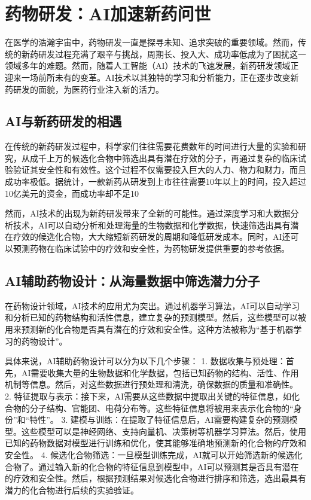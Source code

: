 \section{药物研发：AI加速新药问世}
在医学的浩瀚宇宙中，药物研发一直是探寻未知、追求突破的重要领域。然而，传统的新药研发过程充满了艰辛与挑战，周期长、投入大、成功率低成为了困扰这一领域多年的难题。然而，随着人工智能（AI）技术的飞速发展，新药研发领域正迎来一场前所未有的变革。AI技术以其独特的学习和分析能力，正在逐步改变新药研发的面貌，为医药行业注入新的活力。

\subsection{AI与新药研发的相遇}
在传统的新药研发过程中，科学家们往往需要花费数年的时间进行大量的实验和研究，从成千上万的候选化合物中筛选出具有潜在疗效的分子，再通过复杂的临床试验验证其安全性和有效性。这个过程不仅需要投入巨大的人力、物力和财力，而且成功率极低。据统计，一款新药从研发到上市往往需要10年以上的时间，投入超过10亿美元的资金，而成功率却不足10%

然而，AI技术的出现为新药研发带来了全新的可能性。通过深度学习和大数据分析技术，AI可以自动分析和处理海量的生物数据和化学数据，快速筛选出具有潜在疗效的候选化合物，大大缩短新药研发的周期和降低研发成本。同时，AI还可以预测药物在临床试验中的疗效和安全性，为药物研发提供重要的参考依据。

\subsection{AI辅助药物设计：从海量数据中筛选潜力分子}
在药物设计领域，AI技术的应用尤为突出。通过机器学习算法，AI可以自动学习和分析已知的药物结构和活性信息，建立复杂的预测模型。然后，这些模型可以被用来预测新的化合物是否具有潜在的疗效和安全性。这种方法被称为“基于机器学习的药物设计”。

具体来说，AI辅助药物设计可以分为以下几个步骤：
1. 数据收集与预处理：首先，AI需要收集大量的生物数据和化学数据，包括已知药物的结构、活性、作用机制等信息。然后，对这些数据进行预处理和清洗，确保数据的质量和准确性。
2. 特征提取与表示：接下来，AI需要从这些数据中提取出关键的特征信息，如化合物的分子结构、官能团、电荷分布等。这些特征信息将被用来表示化合物的“身份”和“特性”。
3. 建模与训练：在提取了特征信息后，AI需要构建复杂的预测模型。这些模型可以是神经网络、支持向量机、决策树等机器学习算法。然后，使用已知的药物数据对模型进行训练和优化，使其能够准确地预测新的化合物的疗效和安全性。
4. 候选化合物筛选：一旦模型训练完成，AI就可以开始筛选新的候选化合物了。通过输入新的化合物的特征信息到模型中，AI可以预测其是否具有潜在的疗效和安全性。然后，根据预测结果对候选化合物进行排序和筛选，选出最具有潜力的化合物进行后续的实验验证。

